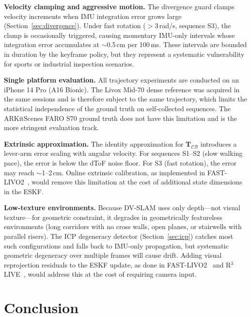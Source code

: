 \textbf{Velocity clamping and aggressive motion.}
The divergence guard clamps velocity increments when IMU integration error grows large (Section~\ref{sec:divergence}). Under fast rotation ($>$3\,rad/s, sequence S3), the clamp is occasionally triggered, causing momentary IMU-only intervals whose integration error accumulates at $\sim$0.5\,cm per 100\,ms. These intervals are bounded in duration by the keyframe policy, but they represent a systematic vulnerability for sports or industrial inspection scenarios.

\textbf{Single platform evaluation.}
All trajectory experiments are conducted on an iPhone 14 Pro (A16 Bionic). The Livox Mid-70 dense reference was acquired in the same sessions and is therefore subject to the same trajectory, which limits the statistical independence of the ground truth on self-collected sequences. The ARKitScenes FARO S70 ground truth does not have this limitation and is the more stringent evaluation track.

\textbf{Extrinsic approximation.}
The identity approximation for $\mathbf{T}_{\mathcal{C}\mathcal{B}}$ introduces a lever-arm error scaling with angular velocity. For sequences S1--S2 (slow walking pace), the error is below the dToF noise floor. For S3 (fast rotation), the error may reach $\sim$1--2\,cm. Online extrinsic calibration, as implemented in FAST-LIVO2~\cite{zheng2024fastlivo2}, would remove this limitation at the cost of additional state dimensions in the ESKF.

\textbf{Low-texture environments.}
Because DV-SLAM uses only depth---not visual texture---for geometric constraint, it degrades in geometrically featureless environments (long corridors with no cross walls, open planes, or stairwells with parallel risers). The ICP degeneracy detector (Section~\ref{sec:icp}) catches most such configurations and falls back to IMU-only propagation, but systematic geometric degeneracy over multiple frames will cause drift. Adding visual reprojection residuals to the ESKF update, as done in FAST-LIVO2~\cite{zheng2024fastlivo2} and R$^3$LIVE~\cite{lin2022r3live}, would address this at the cost of requiring camera input.

\section{Conclusion}
\label{sec:conclusion}

